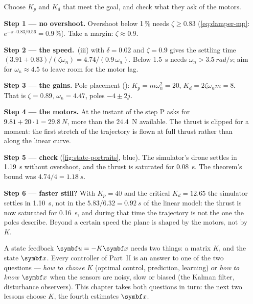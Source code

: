\begin{example}
\label{ex:state-goal}
Choose $K_p$ and $K_d$ that meet the goal, and check what they ask of the motors.

\textbf{Step 1 — no overshoot.} Overshoot below 1\,\% needs $\zeta \ge 0.83$ (\cref{eq:damper-mp}: $e^{-\pi \cdot 0.83/0.56} = 0.9\,\%$). Take a margin: $\zeta \approx 0.9$.

\textbf{Step 2 — the speed.} \,(iii) with $\delta = 0.02$ and $\zeta = 0.9$ gives the settling time $(3.91 + 0.83)/(\zeta\omega_n) = 4.74/(0.9\,\omega_n)$. Below \SI{1.5}{s} needs $\omega_n > \SI{3.5}{rad/s}$; aim for $\omega_n \approx 4.5$ to leave room for the motor lag.

\textbf{Step 3 — the gains.} Pole placement (): $K_p = m\omega_n^2 = 20$, $K_d = 2\zeta\omega_nm = 8$. That is $\zeta = 0.89$, $\omega_n = 4.47$, poles $-4 \pm 2j$.

\textbf{Step 4 — the motors.} At the instant of the step P asks for $9.81 + 20 \cdot 1 = \SI{29.8}{N}$, more than the \SI{24.4}{N} available. The thrust is clipped for a moment: the first stretch of the trajectory is flown at full thrust rather than along the linear curve.

\textbf{Step 5 — check} (\cref{fig:state-portraits}, blue). The simulator's drone settles in \SI{1.19}{s} without overshoot, and the thrust is saturated for \SI{0.08}{s}. The theorem's bound was $4.74/4 = \SI{1.18}{s}$.

\textbf{Step 6 — faster still?} With $K_p = 40$ and the critical $K_d = 12.65$ the simulator settles in \SI{1.10}{s}, not in the $5.83/6.32 = \SI{0.92}{s}$ of the linear model: the thrust is now saturated for \SI{0.16}{s}, and during that time the trajectory is not the one the poles describe. Beyond a certain speed the plane is shaped by the motors, not by $K$.
\end{example}

\begin{keyidea}
A state feedback $\symbf u = -K\vx$ needs two things: a matrix $K$, and the state $\vx$. Every controller of Part~II is an answer to one of the two questions — \emph{how to choose $K$} (optimal control, prediction, learning) or \emph{how to know $\vx$} when the sensors are noisy, slow or biased (the Kalman filter, disturbance observers). This chapter takes both questions in turn: the next two lessons choose $K$, the fourth estimates $\vx$.
\end{keyidea}

